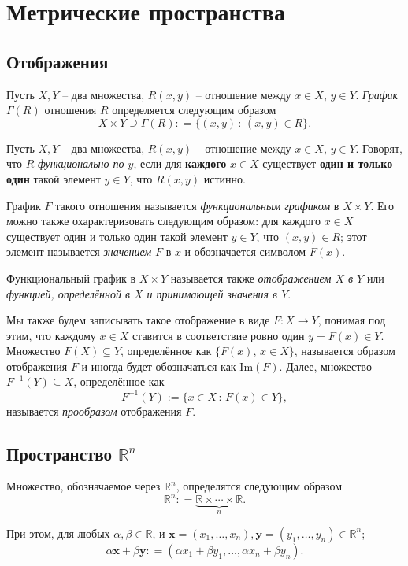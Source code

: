 \chapter{Метрические пространства}


\section{Отображения}
Пусть $X,Y$ -- два множества, $R(x,y)$ -- отношение между $x \in X$, $y \in Y$. \textit{График} $\Gamma(R)$ отношения $R$ определяется следующим образом
\[
 X \times Y \supseteq \Gamma(R) : = \{(x,y) \, :\, (x,y) \in R\}.
\]

Пусть $X,Y$ -- два множества, $R(x,y)$ -- отношение между $x \in X$, $y \in Y$. Говорят, что $R$ \textit{функционально по $y$}, если для \textbf{каждого} $x\in X$ существует \textbf{один и только один} такой элемент $y\in Y$, что $R(x,y)$ истинно.

График $F$ такого отношения называется \textit{функциональным графиком} в $X \times Y$. Его можно также охарактеризовать следующим образом:  для каждого $x \in X$ существует один и только один такой элемент $y \in Y$, что $(x,y) \in R$; этот элемент называется \textit{значением} $F$ в $x$ и обозначается символом $F(x)$.

Функциональный график в $X \times Y$ называется также \textit{отображением $X$ в $Y$} или \textit{функцией, определённой в $X$ и принимающей значения в $Y.$}

Мы также будем записывать такое отображение в виде $F:X \to Y$, понимая под этим, что каждому $x \in X$ ставится в соответствие ровно один $y  = F(x)\in Y$. Множество $F(X) \subseteq Y$, определённое как $\{F(x), \, x \in X\}$, называется образом отображения $F$ и иногда будет обозначаться как $\mathrm{Im}(F).$ Далее, множество $F^{-1}(Y) \subseteq X$, определённое как
\[
 F^{-1}(Y):= \{x \in X\, :\, F(x) \in Y\},
\]
называется \textit{прообразом} отображения $F.$

\section{Пространство $\mathbb{R}^n$}

\begin{definition}
    
Множество, обозначаемое через $\mathbb{R}^n$, определятся следующим образом
\[
 \mathbb{R}^n: = \underbrace{\mathbb{R} \times \cdots \times  \mathbb{R}}_n.
\]

При этом, для любых $\alpha,\beta \in \mathbb{R}$, и $\mathbf{x}=(x_1,\ldots, x_n), \mathbf{y} = (y_1,\ldots, y_n) \in \mathbb{R}^n$;
\[
 \alpha \mathbf{x} + \beta \mathbf{y}: = (\alpha x_1 + \beta y_1, \ldots, \alpha x_n + \beta y_n). 
\]
\end{definition}


